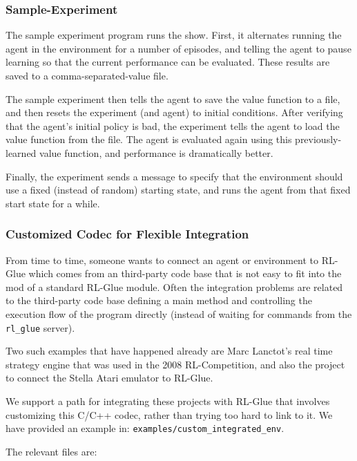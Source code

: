 \documentclass[11pt]{article}
\begin{document}
\subsubsection{Sample-Experiment}
The sample experiment program runs the show.  First, it alternates running the agent in the environment for a number of episodes, and telling the agent to pause learning so that the current performance can be evaluated.  These results are saved to a comma-separated-value file.

The sample experiment then tells the agent to save the value function to a file, and then resets the experiment (and agent) to initial conditions.  After verifying that the agent's initial policy is bad, the experiment tells the agent to load the value function from the file.  The agent is evaluated again using this previously-learned value function, and performance is dramatically better.

Finally, the experiment sends a message to specify that the environment should use a fixed (instead of random) starting state, and runs the agent from that fixed start state for a while.

\subsubsection{Customized Codec for Flexible Integration}
\label{custom-env}
From time to time, someone wants to connect an agent or environment to RL-Glue which comes from 
an third-party code base that is not easy to fit into the mod of a standard RL-Glue module.  Often the 
integration problems are related to the third-party code base defining a main method and controlling 
the execution flow of the program directly (instead of waiting for commands from the \texttt{rl\_glue} server).

Two such examples that have happened already are Marc Lanctot's real time strategy engine that was used
in the 2008 RL-Competition, and also the project to connect the Stella Atari emulator to RL-Glue.

We support a path for integrating these projects with RL-Glue that involves customizing this C/C++ codec, rather than trying too hard to link to it.  We have provided an example in: \texttt{examples/custom\_integrated\_env}.

The relevant files are:\newline
{} \newline
{} \newline
{} \newline
\end{document}
